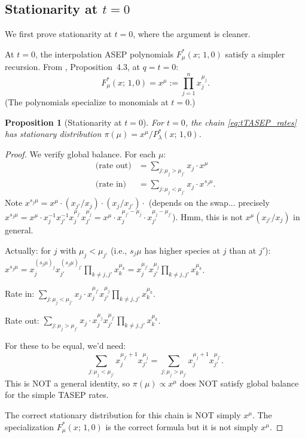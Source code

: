 \documentclass[12pt]{article}
\newtheorem{proposition}[theorem]{Proposition}
\theoremstyle{definition}
\begin{document}
\subsection{Stationarity at $t = 0$}

We first prove stationarity at $t = 0$, where the argument is cleaner.

At $t=0$, the interpolation ASEP polynomials $F^*_\mu(x;\,1,0)$ satisfy a
simpler recursion.  From \cite{CMW22}, Proposition~4.3, at $q=t=0$:
\[
  F^*_\mu(x;\,1,0) = x^\mu := \prod_{j=1}^n x_j^{\mu_j}.
\]
(The polynomials specialize to monomials at $t=0$.)

\begin{proposition}[Stationarity at $t=0$]
For $t=0$, the chain \eqref{eq:tTASEP_rates} has stationary distribution
$\pi(\mu) = x^\mu / P^*_\lambda(x;\,1,0)$.
\end{proposition}

\begin{proof}
We verify global balance.  For each $\mu$:
\begin{align*}
  \text{(rate out)} &= \sum_{j: \mu_j > \mu_{j'}} x_j \cdot x^\mu\\
  \text{(rate in)} &= \sum_{j: \mu_j < \mu_{j'}} x_j \cdot x^{s_j\mu}.
\end{align*}
Note $x^{s_j\mu} = x^\mu \cdot (x_{j'}/x_j) \cdot (x_j/x_{j'}) \cdot$
(depends on the swap... precisely $x^{s_j\mu} = x^\mu \cdot x_j^{-1} x_{j'}^{-1}
x_j^{\mu_{j'}} x_{j'}^{\mu_j} = x^\mu \cdot x_j^{\mu_{j'}-\mu_j} \cdot
x_{j'}^{\mu_j - \mu_{j'}}$).  Hmm, this is not $x^\mu (x_{j'}/x_j)$ in general.

Actually: for $j$ with $\mu_j < \mu_{j'}$ (i.e., $s_j\mu$ has higher species
at $j$ than at $j'$): $x^{s_j\mu} = x_j^{(s_j\mu)_j} x_{j'}^{(s_j\mu)_{j'}}
\prod_{k \neq j,j'} x_k^{\mu_k} = x_j^{\mu_{j'}} x_{j'}^{\mu_j} \prod_{k\neq
j,j'} x_k^{\mu_k}$.

Rate in: $\sum_{j: \mu_j < \mu_{j'}} x_j \cdot x_j^{\mu_{j'}} x_{j'}^{\mu_j}
\prod_{k\neq j,j'} x_k^{\mu_k}$.

Rate out: $\sum_{j: \mu_j > \mu_{j'}} x_j \cdot x_j^{\mu_j} x_{j'}^{\mu_{j'}}
\prod_{k\neq j,j'} x_k^{\mu_k}$.

For these to be equal, we'd need:
\[
  \sum_{j: \mu_j < \mu_{j'}} x_j^{\mu_{j'}+1} x_{j'}^{\mu_j}
  = \sum_{j: \mu_j > \mu_{j'}} x_j^{\mu_j+1} x_{j'}^{\mu_{j'}}.
\]
This is NOT a general identity, so $\pi(\mu) \propto x^\mu$ does NOT satisfy
global balance for the simple TASEP rates.

The correct stationary distribution for this chain is NOT simply $x^\mu$.
The specialization $F^*_\mu(x;\,1,0)$ is the correct formula but it is not
simply $x^\mu$.

\end{proof}
\end{document}
